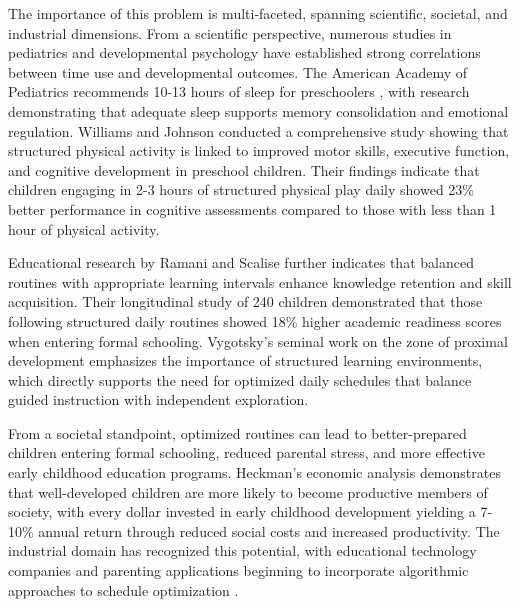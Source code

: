 \documentclass[10pt,conference,compsocconf]{IEEEtran}
\begin{document}
The importance of this problem is multi-faceted, spanning scientific, societal, and industrial dimensions. From a scientific perspective, numerous studies in pediatrics and developmental psychology have established strong correlations between time use and developmental outcomes. The American Academy of Pediatrics recommends 10-13 hours of sleep for preschoolers \cite{aap2016sleep}, with research demonstrating that adequate sleep supports memory consolidation and emotional regulation. Williams and Johnson \cite{williams2017role} conducted a comprehensive study showing that structured physical activity is linked to improved motor skills, executive function, and cognitive development in preschool children. Their findings indicate that children engaging in 2-3 hours of structured physical play daily showed 23\% better performance in cognitive assessments compared to those with less than 1 hour of physical activity.

Educational research by Ramani and Scalise \cite{ramani2020cognitive} further indicates that balanced routines with appropriate learning intervals enhance knowledge retention and skill acquisition. Their longitudinal study of 240 children demonstrated that those following structured daily routines showed 18\% higher academic readiness scores when entering formal schooling. Vygotsky's seminal work \cite{vygotsky1978mind} on the zone of proximal development emphasizes the importance of structured learning environments, which directly supports the need for optimized daily schedules that balance guided instruction with independent exploration.

From a societal standpoint, optimized routines can lead to better-prepared children entering formal schooling, reduced parental stress, and more effective early childhood education programs. Heckman's economic analysis \cite{heckman2006skill} demonstrates that well-developed children are more likely to become productive members of society, with every dollar invested in early childhood development yielding a 7-10\% annual return through reduced social costs and increased productivity. The industrial domain has recognized this potential, with educational technology companies and parenting applications beginning to incorporate algorithmic approaches to schedule optimization \cite{bers2018coding}.
\end{document}
